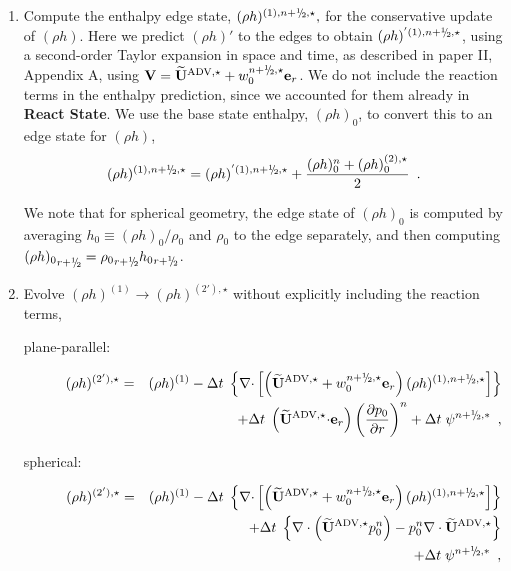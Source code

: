 \begin{description}
\begin{enumerate}
  \begin{enumerate}
  \renewcommand{\labelenumii}{{\bf \roman{enumii}}.}

  \item Compute the enthalpy edge state, $(\rho h)^{(1),\nph,\star},$
    for the conservative update of $(\rho h).$  Here we predict $(\rho
    h)'$ to the edges to obtain $(\rho h)^{'(1),\nph,\star}$, 
    using a second-order Taylor expansion in space
    and time, as described in paper II, Appendix A, using $\Vb =
    \uadvone+w_0^{\nph,\star} \er$.  We do not include the reaction
    terms in the enthalpy prediction, since we accounted for them
    already in {\bf React State}.  We use the base state enthalpy,
    $(\rho h)_0$, to convert this to an edge state for $(\rho h)$,
\begin{equation}
(\rho h)^{(1),\nph,\star} = 
(\rho h)^{'(1),\nph,\star} + \frac{(\rho h)_0^n + (\rho h)_0^{(2),\star}}{2}
\enskip .
\end{equation}
   
   We note that for spherical geometry, the edge state of $(\rho h)_0$
   is computed by averaging $h_0 \equiv (\rho h)_0/\rho_0$ and $\rho_0$
   to the edge separately, and then computing 
   ${(\rho h)_0}_{r+\myhalf} = {\rho_0}_{r+\myhalf} {h_0}_{r+\myhalf}$.

  \item Evolve $(\rho h)^{(1)} \rightarrow (\rho h)^{(2'),\star}$ without
  explicitly including the reaction terms,

\begin{description}
\item[plane-parallel:]

  \begin{eqnarray}
  (\rho h)^{(2'),\star} &=& (\rho h)^{(1)} - \dt \; \left\{ \nablab
      \cdotb \left[ \left(\uadvone+w_0^{\nph,\star} \er\right) (\rho
      h)^{(1),\nph,\star} \right] \right\} \nonumber \\ && + \dt \;
    \left(\uadvone \cdotb \er\right) \left(\frac{\partial
      p_0}{\partial r} \right)^{n} + \dt \; \psi^{\nph,*} \enskip ,
  \end{eqnarray}

\item[spherical:]

  \begin{eqnarray}
  (\rho h)^{(2'),\star} &=& (\rho h)^{(1)} - \dt \; \left\{ \nablab
      \cdotb \left[ \left(\uadvone+w_0^{\nph,\star} \er\right) (\rho
      h)^{(1),\nph,\star} \right] \right\} \nonumber \\ 
    && + \dt \; \left \{ \nabla \cdot \left (\uadvone p_0^{n} \right ) 
       - p_0^{n} \nabla \cdot \uadvone \right \} \nonumber \\
    && + \dt \; \psi^{\nph,*} \enskip ,
  \end{eqnarray}


\end{description}
\end{enumerate}
\end{enumerate}
\end{description}
